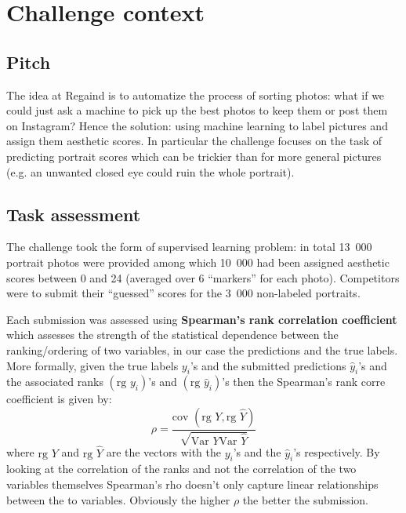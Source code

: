 
    \section{Challenge context}
    
    
    \subsection{Pitch}
    
    The idea at Regaind is to automatize the process of sorting photos: what if we could just ask a machine to pick up the best photos to keep them or post them on Instagram? Hence the solution: using machine learning to label pictures and assign them aesthetic scores. In particular the challenge focuses on the task of predicting portrait scores which can be trickier than for more general pictures (e.g. an unwanted closed eye could ruin the whole portrait).
    
    \subsection{Task assessment}
    
    The challenge took the form of supervised learning problem: in total 13~000 portrait photos were provided among which 10~000 had been assigned aesthetic scores between 0 and 24 (averaged over 6 ``markers'' for each photo). Competitors were to submit their ``guessed'' scores for the 3~000 non-labeled portraits.
    
    Each submission was assessed using \textbf{Spearman's rank correlation coefficient} which assesses the strength of the statistical dependence between the ranking/ordering of two variables, in our case the predictions and the true labels. More formally, given the true labels $y_i$'s and the submitted predictions $\hat y_i$'s and the associated ranks $(\text{rg\ } y_i)$'s and $(\text{rg\ } \hat y_i)$'s then the Spearman's rank corre
     coefficient is given by:
     \begin{equation}
	\rho = \frac{\text{cov\ }( \text{rg\ }Y, \text{rg\ } \hat Y)}{\sqrt{\text{Var\ } Y \text{Var\ } \hat Y}}
     \end{equation}
     where $\text{rg\ }Y$ and $\text{rg\ } \hat Y$ are the vectors with the $y_i$'s and the $\hat y_i$'s respectively. By looking at the correlation of the ranks and not the correlation of the two variables themselves Spearman's rho doesn't only capture linear relationships between the to variables. Obviously the higher $\rho$ the better the submission.
     
